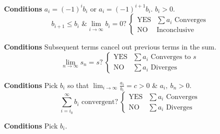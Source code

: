 \documentclass{article}
\begin{document}
\begin{multicols}{2}
\begin{tcolorboxcols}[title={Alternating Series}]
        \textbf{Conditions} \(a_i = \left( -1 \right)^i b_i\) or \(a_i = \left( -1 \right)^{i+1} b_i\). \(b_i>0\).
        \begin{equation*}
            \text{\(b_{i+1}\leqslant b_i\) \& \(\lim_{i\to\infty}b_i=0\)?}\:
            \begin{cases}
                \text{YES} & \text{\(\sum a_i\) Converges} \\
                \text{NO}  & \text{Inconclusive}
            \end{cases}
        \end{equation*}
    \end{tcolorboxcols}
    \begin{tcolorboxcols}[title={Telescoping Series}]
        \textbf{Conditions} Subsequent terms cancel out previous terms in the sum.
        \begin{equation*}
            \text{\(\lim_{n\to\infty}s_n=s\)?}\:
            \begin{cases}
                \text{YES} & \text{\(\sum a_i\) Converges to \(s\)} \\
                \text{NO}  & \text{\(\sum a_i\) Diverges}
            \end{cases}
        \end{equation*}
    \end{tcolorboxcols}
    \begin{tcolorboxcols}[title={Limit Comparison Test}]
        \textbf{Conditions} Pick \(b_i\) so that \(\displaystyle \lim_{i\to\infty}\frac{a_i}{b_i}=c>0\) \& \(a_i,\:b_n>0\).
        \begin{equation*}
            \text{\(\sum_{i=i_0}^\infty b_i\) convergent?}\:
            \begin{cases}
                \text{YES} & \text{\(\sum a_i\) Converges} \\
                \text{NO}  & \text{\(\sum a_i\) Diverges}
            \end{cases}
        \end{equation*}
    \end{tcolorboxcols}
    \begin{tcolorboxcols}[title={Comparison Test}]
        \textbf{Conditions} Pick \(b_i\).


\end{tcolorboxcols}
\end{multicols}
\end{document}
